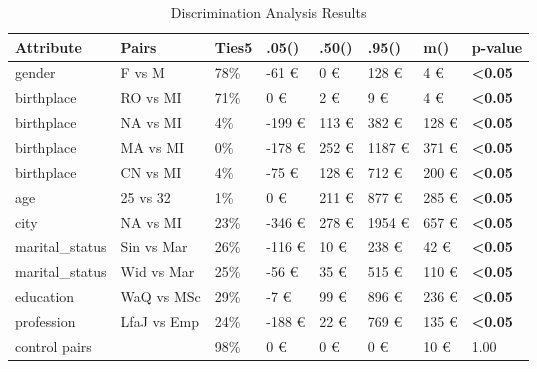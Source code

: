 \begin{table}
\caption{Discrimination Analysis Results}
\label{table:discrimination_analysis}
\begin{tabular}{llllllll}
\toprule
Attribute & Pairs & Ties5 & .05() & .50() & .95() & m() & p-value \\
\midrule
gender & F vs M & 78\% & -61 € & 0 € & 128 € & 4 € & \textbf{<0.05} \\
birthplace & RO vs MI & 71\% & 0 € & 2 € & 9 € & 4 € & \textbf{<0.05} \\
birthplace & NA vs MI & 4\% & -199 € & 113 € & 382 € & 128 € & \textbf{<0.05} \\
birthplace & MA vs MI & 0\% & -178 € & 252 € & 1187 € & 371 € & \textbf{<0.05} \\
birthplace & CN vs MI & 4\% & -75 € & 128 € & 712 € & 200 € & \textbf{<0.05} \\
age & 25 vs 32 & 1\% & 0 € & 211 € & 877 € & 285 € & \textbf{<0.05} \\
city & NA vs MI & 23\% & -346 € & 278 € & 1954 € & 657 € & \textbf{<0.05} \\
marital_status & Sin vs Mar & 26\% & -116 € & 10 € & 238 € & 42 € & \textbf{<0.05} \\
marital_status & Wid vs Mar & 25\% & -56 € & 35 € & 515 € & 110 € & \textbf{<0.05} \\
education & WaQ vs MSc & 29\% & -7 € & 99 € & 896 € & 236 € & \textbf{<0.05} \\
profession & LfaJ vs Emp & 24\% & -188 € & 22 € & 769 € & 135 € & \textbf{<0.05} \\
control pairs &  & 98\% & 0 € & 0 € & 0 € & 10 € & 1.00 \\
\bottomrule
\end{tabular}
\end{table}
